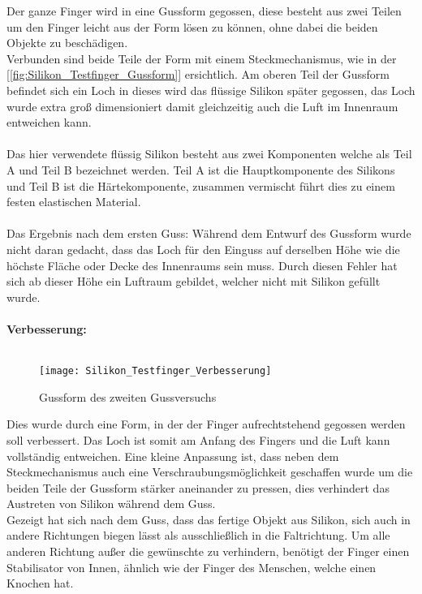 \documentclass[titlepage,12pt,twoside]{article}
\begin{document}
Der ganze Finger wird in eine Gussform gegossen, diese besteht aus zwei Teilen um den Finger leicht aus der Form lösen zu können, ohne dabei die beiden Objekte zu beschädigen. \\
Verbunden sind beide Teile der Form mit einem Steckmechanismus, wie in der [\textcolor{blue}{\autoref{fig:Silikon_Testfinger_Gussform}}] ersichtlich. Am oberen Teil der Gussform befindet sich ein Loch in dieses wird das flüssige Silikon später gegossen, das Loch wurde extra groß 
dimensioniert damit gleichzeitig auch die Luft im Innenraum entweichen kann. \\
\\
Das hier verwendete flüssig Silikon besteht aus zwei Komponenten welche als Teil A und Teil B bezeichnet werden. Teil A ist die Hauptkomponente des Silikons und Teil B ist die Härtekomponente, zusammen vermischt führt dies zu einem festen elastischen 
Material. \\
\\
Das Ergebnis nach dem ersten Guss: Während dem Entwurf des Gussform wurde nicht daran gedacht, dass das Loch für den Einguss auf derselben Höhe wie die höchste Fläche oder Decke des Innenraums sein muss. Durch diesen Fehler hat sich ab dieser Höhe 
ein Luftraum gebildet, welcher nicht mit Silikon gefüllt wurde. \\
\\
\textbf{Verbesserung:} \\
\\
\begin{figure}[H]
	\begin{center}
		\scalebox{0.8}
		{\texttt{[image: Silikon\_Testfinger\_Verbesserung]}}
		\caption{Gussform des zweiten Gussversuchs}
		\label{fig:Silikon_Testfinger_Verbesserung}			
	\end{center}
\end{figure}
\hfill \break
Dies wurde durch eine Form, in der der Finger aufrechtstehend gegossen werden soll verbessert. Das Loch ist somit am Anfang des Fingers und die Luft kann vollständig entweichen. Eine kleine Anpassung ist, dass neben dem Steckmechanismus auch eine 
Verschraubungsmöglichkeit geschaffen wurde um die beiden Teile der Gussform stärker aneinander zu pressen, dies verhindert das Austreten von Silikon während dem Guss. \\
Gezeigt hat sich nach dem Guss, dass das fertige Objekt aus Silikon, sich auch in andere Richtungen biegen lässt als ausschließlich in die Faltrichtung. Um alle anderen Richtung außer die gewünschte zu verhindern, benötigt der Finger einen 
Stabilisator von Innen, ähnlich wie der Finger des Menschen, welche einen Knochen hat. \\
\\
\end{document}
